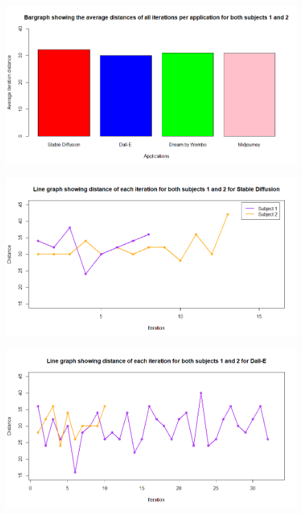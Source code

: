 \documentclass[]{report}
\begin{document}
	\newpage
    \begin{figure}
    	\centering
    	\includegraphics[width=1\linewidth]{Bargraph}
    	\caption{}
    	\label{fig:bargraph}
    \end{figure}
    
	\begin{figure}
		\centering
		\includegraphics[width=1\linewidth]{LineGraphStableDiff}
		\caption{}
		\label{fig:linegraphstablediff}
	\end{figure}

	\begin{figure}
		\centering
		\includegraphics[width=1\linewidth]{LineGraphDall-E}
		\caption{}
		\label{fig:linegraphdall-e}
	\end{figure}
	
\end{document}
